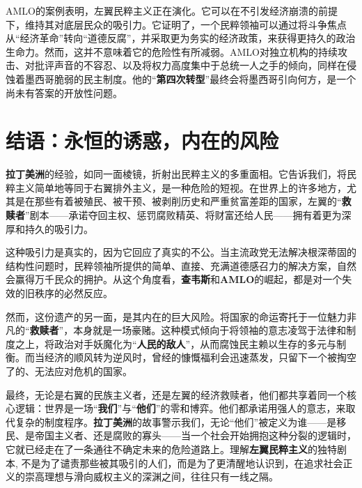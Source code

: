 AMLO的案例表明，左翼民粹主义正在演化。它可以在不引发经济崩溃的前提下，维持其对底层民众的吸引力。它证明了，一个民粹领袖可以通过将斗争焦点从“经济革命”转向“道德反腐”，并采取更为务实的经济政策，来获得更持久的政治生命力。然而，这并不意味着它的危险性有所减弱。AMLO对独立机构的持续攻击、对批评声音的不容忍、以及将权力高度集中于总统一人之手的倾向，同样在侵蚀着墨西哥脆弱的民主制度。他的“\textbf{第四次转型}”最终会将墨西哥引向何方，是一个尚未有答案的开放性问题。

\section{结语：永恒的诱惑，内在的风险}
\textbf{拉丁美洲}的经验，如同一面棱镜，折射出民粹主义的多重面相。它告诉我们，将民粹主义简单地等同于右翼排外主义，是一种危险的短视。在世界上的许多地方，尤其是在那些有着被殖民、被干预、被剥削历史和严重贫富差距的国家，左翼的“\textbf{救赎者}”剧本——承诺夺回主权、惩罚腐败精英、将财富还给人民——拥有着更为深厚和持久的吸引力。

这种吸引力是真实的，因为它回应了真实的不公。当主流政党无法解决根深蒂固的结构性问题时，民粹领袖所提供的简单、直接、充满道德感召力的解决方案，自然会赢得万千民众的拥护。从这个角度看，\textbf{查韦斯}和\textbf{AMLO}的崛起，都是对一个失效的旧秩序的必然反应。

然而，这份遗产的另一面，是其内在的巨大风险。将国家的命运寄托于一位魅力非凡的“\textbf{救赎者}”，本身就是一场豪赌。这种模式倾向于将领袖的意志凌驾于法律和制度之上，将政治对手妖魔化为“\textbf{人民的敌人}”，从而腐蚀民主赖以生存的多元与制衡。而当经济的顺风转为逆风时，曾经的慷慨福利会迅速蒸发，只留下一个被掏空了的、无法应对危机的国家。

最终，无论是右翼的民族主义者，还是左翼的经济救赎者，他们都共享着同一个核心逻辑：世界是一场“\textbf{我们}”与“\textbf{他们}”的零和博弈。他们都承诺用强人的意志，来取代复杂的制度程序。\textbf{拉丁美洲}的故事警示我们，无论“他们”被定义为谁——是移民、是帝国主义者、还是腐败的寡头——当一个社会开始拥抱这种分裂的逻辑时，它就已经走在了一条通往不确定未来的危险道路上。理解\textbf{左翼民粹主义}的独特剧本, 不是为了谴责那些被其吸引的人们，而是为了更清醒地认识到，在追求社会正义的崇高理想与滑向威权主义的深渊之间，往往只有一线之隔。